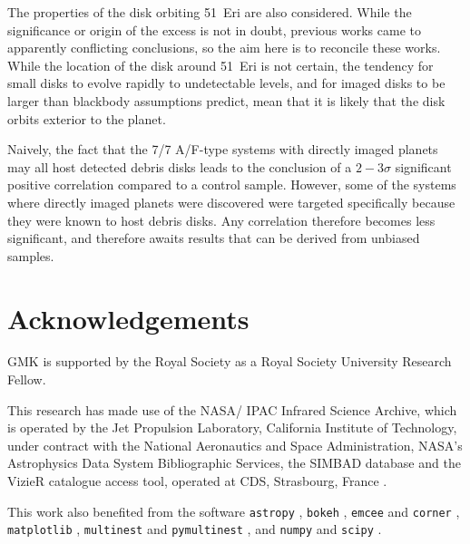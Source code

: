 \documentclass[a4paper,fleqn,usenatbib]{mnras}
\begin{document}
The properties of the disk orbiting 51~Eri are also considered. While
the significance or origin of the excess is not in doubt, previous works
came to apparently conflicting conclusions, so the aim here is to
reconcile these works. While the location of the disk around 51~Eri is
not certain, the tendency for small disks to evolve rapidly to
undetectable levels, and for imaged disks to be larger than blackbody
assumptions predict, mean that it is likely that the disk orbits
exterior to the planet.

Naively, the fact that the 7/7 A/F-type systems with directly imaged
planets may all host detected debris disks leads to the conclusion of a
$2-3\sigma$ significant positive correlation compared to a control
sample. However, some of the systems where directly imaged planets were
discovered were targeted specifically because they were known to host
debris disks. Any correlation therefore becomes less significant, and
therefore awaits results that can be derived from unbiased samples.

\section*{Acknowledgements}

GMK is supported by the Royal Society as a Royal Society University
Research Fellow.

This research has made use of the NASA/ IPAC Infrared Science Archive,
which is operated by the Jet Propulsion Laboratory, California Institute
of Technology, under contract with the National Aeronautics and Space
Administration, NASA's Astrophysics Data System Bibliographic Services,
the SIMBAD database and the VizieR catalogue access tool, operated at
CDS, Strasbourg, France
\citep{2000A&AS..143....9W,2000A&AS..143...23O}.

This work also benefited from the software \texttt{astropy}
\citep{2013A&A...558A..33A}, \texttt{bokeh} \citep{bokeh},
\texttt{emcee} and \texttt{corner} \citep{2013PASP..125..306F,corner},
\texttt{matplotlib} \citep{Hunter:2007}, \texttt{multinest} and
\texttt{pymultinest} \citep{2009MNRAS.398.1601F,2014A&A...564A.125B},
and \texttt{numpy} and \texttt{scipy} \citep{numpy2011}.





\end{document}
